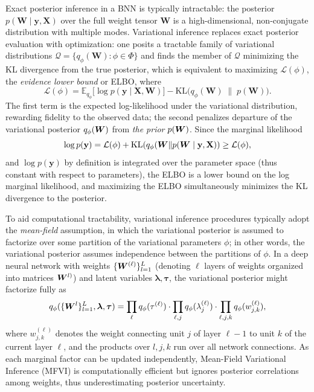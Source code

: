 Exact posterior inference in a BNN is typically intractable: the posterior
$p(\mathbf{W} \mid \mathbf{y}, \mathbf{X})$ over the full weight
tensor $\mathbf{W}$ is a high-dimensional, non-conjugate
distribution with multiple modes.  Variational inference
\citep{blei_variational_2017} replaces exact posterior evaluation
with optimization: one posits a tractable family of variational distributions 
$\mathcal{Q} = \{q_\phi(\mathbf{W}) : \phi \in \Phi\}$ and finds
the member of $\mathcal{Q}$ minimizing the 
KL divergence from the true posterior, which is equivalent to maximizing $\mathcal{L}(\phi)$, the
\emph{evidence lower bound} or ELBO, where
\begin{equation}
  \mathcal{L}(\phi)
  = \mathbb{E}_{q_\phi}\!\bigl[\log p(\mathbf{y} \mid \mathbf{X},
    \mathbf{W})\bigr]
  - \mathrm{KL}\bigl(q_\phi(\mathbf{W}) \;\|\; p(\mathbf{W})\bigr).
  \label{eq:elbo}
\end{equation}
The first term is the expected log-likelihood under the variational distribution, rewarding fidelity to the observed data; the second
penalizes departure of the variational posterior $q_\phi(\bm{W})$ from \textit{the prior} $p(\bm{W})$.  Since the marginal likelihood 
\begin{equation}
    \log p(\mathbf{y}) = \mathcal{L}(\phi) +
\mathrm{KL}(q_\phi(\bm{W} \| p(\bm{W} \mid \mathbf{y},\mathbf{X})) \geq
\mathcal{L}(\phi), 
    \label{eq:marglike}
\end{equation}
and $\log p(\mathbf{y})$ by definition is integrated over the parameter space (thus constant with respect to parameters),
the ELBO is a lower bound on the log marginal
likelihood, and maximizing the ELBO simultaneously minimizes the
KL divergence to the posterior.

To aid computational tractability, variational inference procedures typically adopt the \emph{mean-field} assumption, in which the variational posterior is assumed to 
factorize over some partition of the variational parameters $\phi$; in other words, the variational posterior assumes independence between the partitions of $\phi$. In a deep neural network with weights $\{ \bm{W}^{(\ell)} \}_{l=1}^L$ (denoting $\ell$ layers of weights organized into matrices $\bm{W}^{l)}$) and latent variables $\bm{\lambda}, \bm{\tau}$, the variational posterior might factorize fully as
\begin{equation}
  q_\phi( \{ \bm{W}^{l} \}_{l=1}^L, \bm{\lambda}, \bm{\tau})
  = \prod_\ell q_\phi(\tau^{(\ell)}) 
  \cdot \prod_{\ell,j} q_\phi(\lambda^{(\ell)}_j)
  \cdot \prod_{\ell,j,k} q_\phi(w^{(\ell)}_{j,k}),
  \label{eq:mean-field}
\end{equation}
where $w^{(\ell)}_{j,k}$ denotes the weight connecting unit $j$ of layer $\ell-1$ to unit $k$ of the current layer $\ell$, and the products
over $l, j, k$ run over all network connections.  As each marginal factor can be
updated independently, Mean-Field
Variational Inference (MFVI) is computationally efficient but ignores posterior correlations
among weights, thus underestimating posterior uncertainty.  


